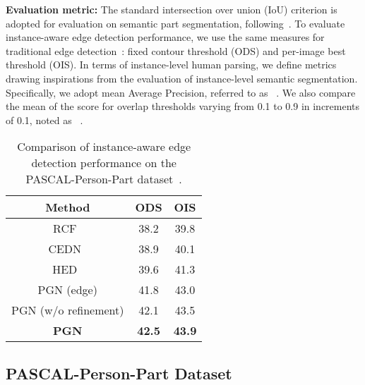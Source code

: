 \documentclass[runningheads]{llncs}
\begin{document}
\textbf{Evaluation metric:}
The standard intersection over union (IoU) criterion is adopted for evaluation on semantic part segmentation, following~\cite{chen2014detect}. To evaluate instance-aware edge detection performance, we use the same measures for traditional edge detection~\cite{Liu_2017_CVPR}: fixed contour threshold (ODS) and per-image best threshold (OIS). In terms of instance-level human parsing, we define metrics drawing inspirations from the evaluation of instance-level semantic segmentation. Specifically, we adopt mean Average Precision, referred to as ~\cite{hariharan2014simultaneous}. We also compare the mean of the  score for overlap thresholds varying from 0.1 to 0.9 in increments of 0.1, noted as ~\cite{li2017holistic}.





\begin{table}[t]
\centering
\small
\caption{Comparison of instance-aware edge detection performance on the PASCAL-Person-Part dataset~\cite{chen2014detect}.}
\tabcolsep 0.25in 
\begin{tabular}{ccc}
\toprule[0.7pt]
   Method                                       & ODS            & OIS   \\ \hline 
   RCF~\cite{Liu_2017_CVPR}                     & 38.2           & 39.8   \\
   CEDN~\cite{yang2016object}                   & 38.9           & 40.1      \\ 
   HED~\cite{xie2015holistically}               & 39.6           & 41.3    \\  \hline
   PGN (edge)                                   & 41.8           & 43.0         \\
   PGN (w/o refinement)                         & 42.1           & 43.5         \\  \hline
   \textbf{PGN}                                 & \textbf{42.5}  & \textbf{43.9}      \\
\toprule[0.7pt]
\end{tabular}
\vspace{-8mm}
\label{tab: edge_result}
\end{table}





\subsection{PASCAL-Person-Part Dataset}
\end{document}
